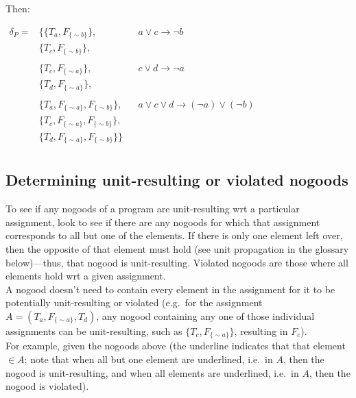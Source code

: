 \documentclass[9pt,a4paper,landscape]{article}
\newcommand{\ngfb}[1]{F_{ \{#1\} }}
\newcommand{\ngta}[1]{T_{#1}}
\newcommand{\ngfa}[1]{F_{#1}}
\begin{document}
{Then:
\begin{center}
	$\begin{array}{rlll}
	\delta_P = 	& \{ \{ \ngta{a}, \ngfb{{\sim} b} \}, && a \lor c \rightarrow \neg b \\
				& \{ \ngta{c}, \ngfb{{\sim} b} \}, && \\ &\\
				& \{ \ngta{c}, \ngfb{{\sim} a} \}, && c \lor d \rightarrow \neg a \\
				& \{ \ngta{d}, \ngfb{{\sim} a} \}, && \\ &\\
				& \{ \ngta{a}, \ngfb{{\sim} a}, \ngfb{{\sim} b} \}, && a \lor c \lor d \rightarrow (\neg a) \lor (\neg b) \\
				& \{ \ngta{c}, \ngfb{{\sim} a}, \ngfb{{\sim} b} \}, && \\			
				& \{ \ngta{d}, \ngfb{{\sim} a}, \ngfb{{\sim} b} \} \} && \\		
	\end{array}$
\end{center}


\subsection{Determining unit-resulting or violated nogoods}
\label{subsec:ng-viol}

\renewcommand{\arraystretch}{1.5}

To see if any nogoods of a program are unit-resulting wrt a particular assignment, look to see if there are any nogoods for which that assignment corresponds to all but one of the elements.
If there is only one element left over, then the opposite of that element must hold (see unit propagation in the glossary below)---thus, that nogood is unit-resulting.
Violated nogoods are those where all elements hold wrt a given assignment.\\

A nogood doesn't need to contain every element in the assignment for it to be potentially unit-resulting or violated (e.g.\ for the assignment $A = (\ngta{a}, \ngfb{{\sim} a}, \ngta{d})$, any nogood containing any one of those individual assignments can be unit-resulting, such as $\{\ngta{c}, \ngfb{{\sim} a}\}$, resulting in $\ngfa{c}$).\\

For example, given the nogoods above (the underline indicates that that element $\in A$; note that when all but one element are underlined, i.e.\ in $A$, then the nogood is unit-resulting, and when all elements are underlined, i.e.\ in $A$, then the nogood is violated).

}
\end{document}
